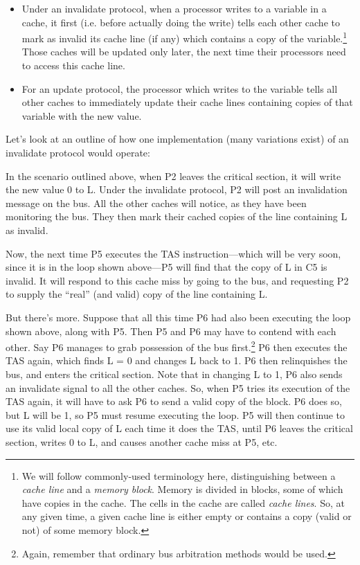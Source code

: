 \begin{itemize}

\item Under an invalidate protocol, when a processor writes to a
variable in a cache, it first (i.e. before actually doing the write)
tells each other cache to mark as invalid its cache line (if any) which
contains a copy of the variable.\footnote{We will follow commonly-used
terminology here, distinguishing between a {\it cache line} and a {\it
memory block}.  Memory is divided in blocks, some of which have copies
in the cache.  The cells in the cache are called {\it cache lines}.  So,
at any given time, a given cache line is either empty or contains a copy
(valid or not) of some memory block.} Those caches will be updated only
later, the next time their processors need to access this cache line.

\item For an update protocol, the processor which writes to the variable
tells all other caches to immediately update their cache lines
containing copies of that variable with the new value.

\end{itemize}

Let's look at an outline of how one implementation (many variations exist)
of an invalidate protocol would operate:

In the scenario outlined above, when P2 leaves the critical section, it
will write the new value 0 to L. Under the invalidate protocol, P2 will
post an invalidation message on the bus. All the other caches will
notice, as they have been monitoring the bus. They then mark their
cached copies of the line containing L as invalid.

Now, the next time P5 executes the TAS instruction---which will be very
soon, since it is in the loop shown above---P5 will find that the copy
of L in C5 is invalid. It will respond to this cache miss by going to
the bus, and requesting P2 to supply the ``real'' (and valid) copy of
the line containing L.

But there's more.  Suppose that all this time P6 had also been executing
the loop shown above, along with P5.  Then P5 and P6 may have to contend
with each other.  Say P6 manages to grab possession of the bus
first.\footnote{Again, remember that ordinary bus arbitration methods
would be used.} P6 then executes the TAS again, which finds L = 0 and
changes L back to 1.  P6 then relinquishes the bus, and enters the
critical section.  Note that in changing L to 1, P6 also sends an
invalidate signal to all the other caches.  So, when P5 tries its
execution of the TAS again, it will have to ask P6 to send a valid copy
of the block.  P6 does so, but L will be 1, so P5 must resume executing
the loop. P5 will then continue to use its valid local copy of L each
time it does the TAS, until P6 leaves the critical section, writes 0 to
L, and causes another cache miss at P5, etc.

